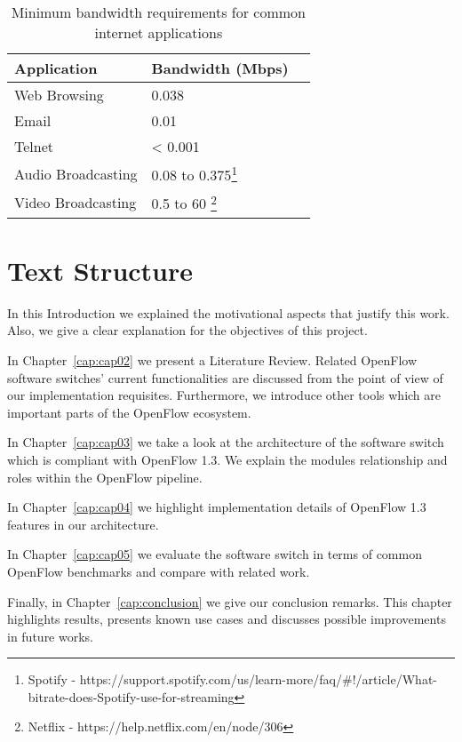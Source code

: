 \begin{enumerate}
\begin{savenotes}
    \begin{table}[h]
    \centering
    \caption{Minimum bandwidth requirements for common internet applications}
    \label{tab:appband}
    \begin{tabular}{|l|l|l|}
    \hline
    \textbf{Application}          & \textbf{Bandwidth (Mbps)}                         \\ \hline
    Web Browsing                      & 0.038                                        \\ \hline
    Email                             & 0.01                                          \\ \hline
    Telnet                            & < 0.001                                          \\ \hline
    Audio Broadcasting                & 0.08 to 0.375\footnote{Spotify - https://support.spotify.com/us/learn-more/faq/\#!/article/What-bitrate-does-Spotify-use-for-streaming}                                          \\ \hline
    Video Broadcasting                & 0.5 to 60 \footnote{Netflix - https://help.netflix.com/en/node/306}                                          \\ \hline
    
    \end{tabular}
    \end{table}
\end{savenotes}

\end{enumerate}

\pagebreak
\section{Text Structure}
\label{sec:sec03}

In this Introduction we explained the motivational aspects that justify this work. Also, we give a clear explanation for the objectives of this project. 

In Chapter~\ref{cap:cap02} we present a Literature Review. Related OpenFlow software switches' current functionalities are discussed from the point of view of our implementation requisites. Furthermore, we introduce other tools which are important parts of the OpenFlow ecosystem. 

In Chapter~\ref{cap:cap03} we take a look at the architecture of the software switch which is compliant with OpenFlow 1.3. We explain the modules relationship and roles within the OpenFlow pipeline.

In Chapter~\ref{cap:cap04} we highlight implementation details of OpenFlow 1.3 features in our architecture.  

In Chapter~\ref{cap:cap05} we evaluate the software switch in terms of common OpenFlow benchmarks and compare with related work.

Finally, in Chapter~\ref{cap:conclusion} we give our conclusion remarks. This chapter highlights results, presents known use cases and discusses possible improvements in future works. 